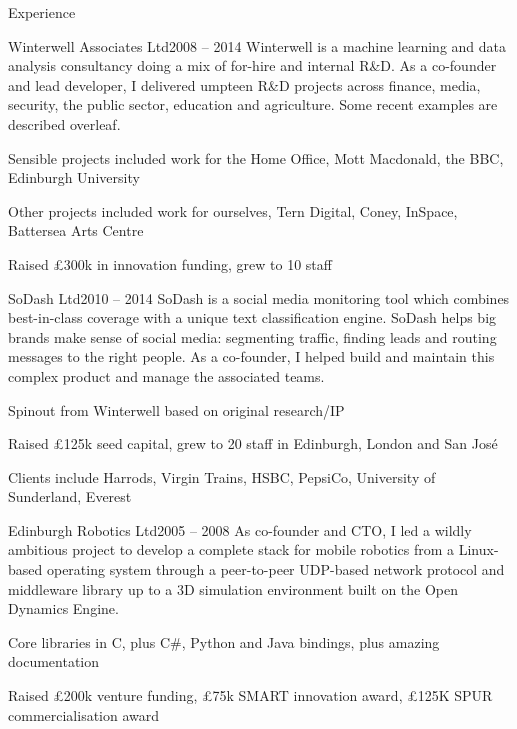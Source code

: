 \documentclass{resume} %
\begin{document}
\begin{rSection}{Experience}

\begin{rSubsection}{Winterwell Associates Ltd}{2008 -- 2014}
{Winterwell is a machine learning and data analysis consultancy doing a mix of for-hire and internal R\&D. As a co-founder and lead developer, I delivered umpteen R\&D projects across finance, media, security, the public sector, education and agriculture. Some recent examples are described overleaf.}{}
\item Sensible projects included work for the Home Office, Mott Macdonald, the BBC, Edinburgh University
\item Other projects included work for ourselves, Tern Digital, Coney, InSpace, Battersea Arts Centre
\item Raised £300k in innovation funding, grew to 10 staff
\end{rSubsection}


\begin{rSubsection}{SoDash Ltd}{2010 -- 2014}
{SoDash is a social media monitoring tool which combines best-in-class coverage
with a unique text classification engine. SoDash helps big brands make sense of
social media: segmenting traffic, finding leads and routing messages to the right people.
As a co-founder, I helped build and maintain this complex product and manage the associated teams.}{}
\item Spinout from Winterwell based on original research/IP
\item Raised £125k seed capital, grew to 20 staff in Edinburgh, London and San José
\item Clients include Harrods, Virgin Trains, HSBC, PepsiCo, University of Sunderland, Everest
\end{rSubsection}


\begin{rSubsection}{Edinburgh Robotics Ltd}{2005 -- 2008}
{As co-founder and CTO, I led a wildly ambitious project to develop a complete stack for mobile robotics from a Linux-based operating system through a peer-to-peer UDP-based network protocol and middleware library up to a 3D simulation environment built on the Open Dynamics Engine.}{}
\item Core libraries in C, plus C\#, Python and Java bindings, plus amazing documentation
\item Raised £200k venture funding, £75k SMART innovation award, £125K SPUR commercialisation award
\end{rSubsection}


\end{rSection}
\end{document}
